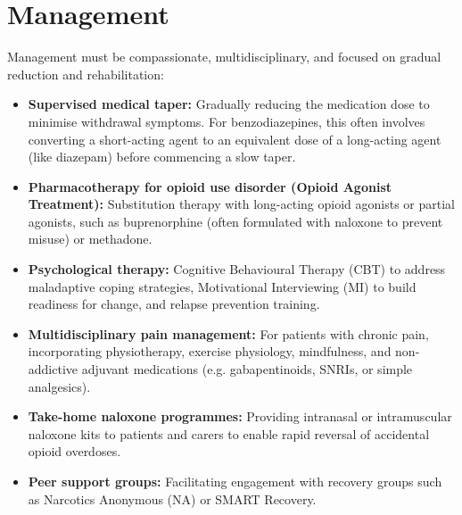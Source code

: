 \section*{Management}
Management must be compassionate, multidisciplinary, and focused on gradual reduction and rehabilitation:
\begin{itemize}
    \item \textbf{Supervised medical taper:} Gradually reducing the medication dose to minimise withdrawal symptoms. For benzodiazepines, this often involves converting a short-acting agent to an equivalent dose of a long-acting agent (like diazepam) before commencing a slow taper.
    \item \textbf{Pharmacotherapy for opioid use disorder (Opioid Agonist Treatment):} Substitution therapy with long-acting opioid agonists or partial agonists, such as buprenorphine (often formulated with naloxone to prevent misuse) or methadone.
    \item \textbf{Psychological therapy:} Cognitive Behavioural Therapy (CBT) to address maladaptive coping strategies, Motivational Interviewing (MI) to build readiness for change, and relapse prevention training.
    \item \textbf{Multidisciplinary pain management:} For patients with chronic pain, incorporating physiotherapy, exercise physiology, mindfulness, and non-addictive adjuvant medications (e.g. gabapentinoids, SNRIs, or simple analgesics).
    \item \textbf{Take-home naloxone programmes:} Providing intranasal or intramuscular naloxone kits to patients and carers to enable rapid reversal of accidental opioid overdoses.
    \item \textbf{Peer support groups:} Facilitating engagement with recovery groups such as Narcotics Anonymous (NA) or SMART Recovery.
\end{itemize}


